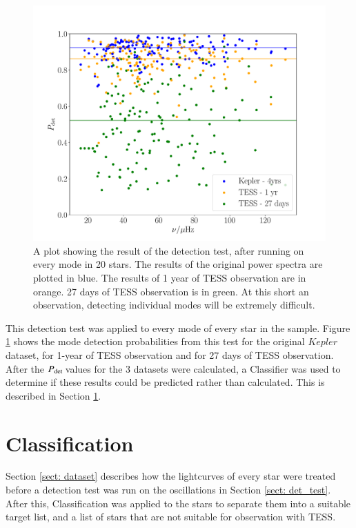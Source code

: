 \documentclass[a4paper,fleqn,usenatbib,useAMS]{mnras}
\newcommand{\kep}{\ensuremath{Kepler}\:}
\newcommand{\pdet}{\ensuremath{P_{\rm det}\:}}
\begin{document}
\begin{figure}
	\centering
	\includegraphics[scale=0.3]{DetTest_Diagnostic_plot3.pdf}
	\caption{A plot showing the result of the detection test, after running on every mode in 20 stars. The results of the original power spectra are plotted in blue. The results of 1 year of TESS observation are in orange. 27 days of TESS observation is in green. At this short an observation, detecting individual modes will be extremely difficult.}	
	\label{fig: modes}
\end{figure}

This detection test was applied to every mode of every star in the sample. Figure \ref{fig: modes} shows the mode detection probabilities from this test for the original \kep dataset, for 1-year of TESS observation and for 27 days of TESS observation. After the \pdet values for the 3 datasets were calculated, a Classifier was used to determine if these results could be predicted rather than calculated. This is described in Section \ref{sect: classifier}.


\section{Classification}
\label{sect: classifier}

Section \ref{sect: dataset} describes how the lightcurves of every star were treated before a detection test was run on the oscillations in Section \ref{sect: det_test}. After this, Classification was applied to the stars to separate them into a suitable target list, and a list of stars that are not suitable for observation with TESS.
\end{document}
